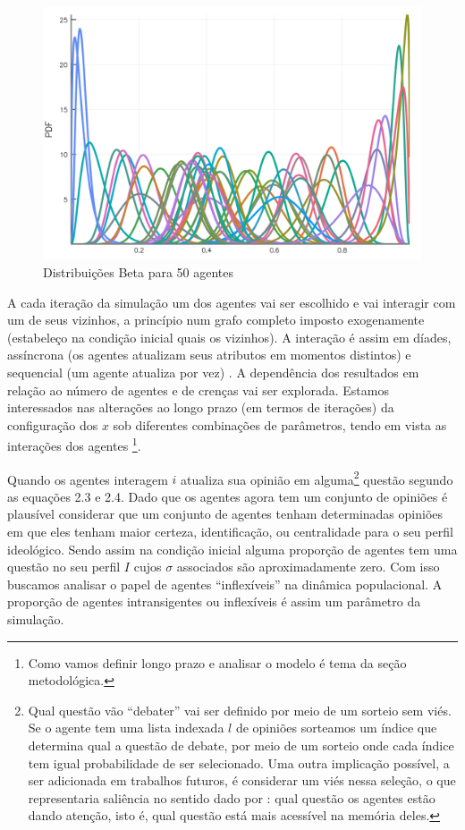 \begin{figure}[H]
  \centering
  \includegraphics[width=\textwidth]{ims/beta100.png}
  \caption{Distribuições Beta para 50 agentes}
  \label{fig:betas100}
\end{figure}


A cada iteração da simulação um dos agentes vai ser escolhido e vai interagir
com um de seus vizinhos, a princípio num grafo completo imposto exogenamente
(estabeleço na condição inicial quais os vizinhos). A interação é assim em
díades, assíncrona (os agentes atualizam seus atributos em momentos distintos) e
sequencial (um agente atualiza por vez) \cite{wilensky2015introduction}. A
dependência dos resultados em relação ao número de agentes e de crenças vai ser
explorada. Estamos interessados nas alterações ao longo prazo (em termos de
iterações) da configuração dos \(x\) sob diferentes combinações de parâmetros,
tendo em vista as interações dos agentes \cite{acemoglu2011opinion}
\footnote{Como vamos definir longo prazo e analisar o modelo é tema da seção
  metodológica.}.

Quando os agentes interagem \(i\) atualiza sua opinião em alguma\footnote{Qual
  questão vão ``debater'' vai ser definido por meio de um sorteio sem viés. Se o
  agente tem uma lista indexada \(l\) de opiniões sorteamos um índice que
  determina qual a questão de debate, por meio de um sorteio onde cada índice
  tem igual probabilidade de ser selecionado. Uma outra implicação possível, a
  ser adicionada em trabalhos futuros, é considerar um viés nessa seleção, o que
  representaria saliência no sentido dado por :
  qual questão os agentes estão dando atenção, isto é, qual questão está mais
  acessível na memória deles.} questão segundo as equações 2.3 e 2.4. Dado que
os agentes agora tem um conjunto de opiniões é plausível considerar que um
conjunto de agentes tenham determinadas opiniões em que eles tenham maior
certeza, identificação, ou centralidade para o seu perfil ideológico. Sendo
assim na condição inicial alguma proporção de agentes tem uma questão no seu
perfil \(I\) cujos \(\sigma\) associados são aproximadamente zero. Com isso buscamos
analisar o papel de agentes ``inflexíveis'' na dinâmica populacional. A
proporção de agentes intransigentes ou inflexíveis é assim um parâmetro da
simulação.

